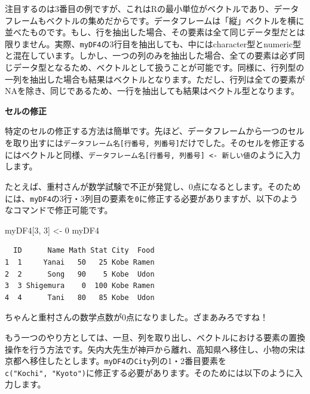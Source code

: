 \documentclass[
  a4paper,
  pandoc,
  ja=standard,
  jafont=haranoaji]{bxjsbook}
\newenvironment{Shaded}{\begin{snugshade}}{\end{snugshade}}
\newcommand{\DecValTok}[1]{\textcolor[rgb]{0.68,0.00,0.00}{#1}}
\newcommand{\FunctionTok}[1]{\textcolor[rgb]{0.28,0.35,0.67}{#1}}
\newcommand{\NormalTok}[1]{\textcolor[rgb]{0.00,0.48,0.65}{#1}}
\newcommand{\OtherTok}[1]{\textcolor[rgb]{0.00,0.48,0.65}{#1}}
\newcommand{\SpecialCharTok}[1]{\textcolor[rgb]{0.37,0.37,0.37}{#1}}
\newcommand{\StringTok}[1]{\textcolor[rgb]{0.13,0.47,0.30}{#1}}
\begin{document}
注目するのは3番目の例ですが、これはRの最小単位がベクトルであり、データフレームもベクトルの集めだからです。データフレームは「縦」ベクトルを横に並べたものです。もし、行を抽出した場合、その要素は全て同じデータ型だとは限りません。実際、\texttt{myDF4}の3行目を抽出しても、中にはcharacter型とnumeric型と混在しています。しかし、一つの列のみを抽出した場合、全ての要素は必ず同じデータ型となるため、ベクトルとして扱うことが可能です。同様に、行列型の一列を抽出した場合も結果はベクトルとなります。ただし、行列は全ての要素がNAを除き、同じであるため、一行を抽出しても結果はベクトル型となります。

\textbf{セルの修正}

特定のセルの修正する方法は簡単です。先ほど、データフレームから一つのセルを取り出すには\texttt{データフレーム名{[}行番号,\ 列番号{]}}だけでした。そのセルを修正するにはベクトルと同様、\texttt{データフレーム名{[}行番号,\ 列番号{]}\ \textless{}-\ 新しい値}のように入力します。

たとえば、重村さんが数学試験で不正が発覚し、0点になるとします。そのためには、\texttt{myDF4}の3行・3列目の要素を\texttt{0}に修正する必要がありますが、以下のようなコマンドで修正可能です。

\begin{Shaded}
\begin{Highlighting}[numbers=left,,]
\NormalTok{myDF4[}\DecValTok{3}\NormalTok{, }\DecValTok{3}\NormalTok{] }\OtherTok{\textless{}{-}} \DecValTok{0}
\NormalTok{myDF4}
\end{Highlighting}
\end{Shaded}

\begin{verbatim}
  ID      Name Math Stat City  Food
1  1     Yanai   50   25 Kobe Ramen
2  2      Song   90    5 Kobe  Udon
3  3 Shigemura    0  100 Kobe Ramen
4  4      Tani   80   85 Kobe  Udon
\end{verbatim}

ちゃんと重村さんの数学点数が0点になりました。ざまあみろですね！

もう一つのやり方としては、一旦、列を取り出し、ベクトルにおける要素の置換操作を行う方法です。矢内大先生が神戸から離れ、高知県へ移住し、小物の宋は京都へ移住したとします。\texttt{myDF4}の\texttt{City}列の1・2番目要素を\texttt{c("Kochi",\ "Kyoto")}に修正する必要があります。そのためには以下のように入力します。

\begin{Shaded}
\end{Shaded}
\end{document}
